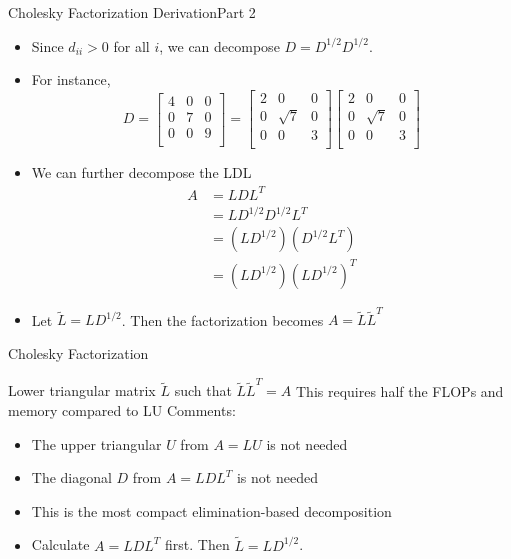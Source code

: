 \documentclass[10pt]{beamer}
\begin{document}
\begin{frame}{Cholesky Factorization Derivation}{Part 2}

\begin{itemize}
    \item Since $d_{ii}>0$ for all $i$, we can decompose $D = D^{1/2} D^{1/2}$. 
    
    \item For instance, 
    $$
    D = 
    \begin{bmatrix}
    4 & 0 &0\\
    0 & 7 &0\\
    0 & 0 &9\\
    \end{bmatrix} = 
    \begin{bmatrix}
    2 & 0 &0\\
    0 & \sqrt{7} &0\\
    0 & 0 &3\\
    \end{bmatrix}
    \begin{bmatrix}
    2 & 0 &0\\
    0 & \sqrt{7} &0\\
    0 & 0 &3\\
    \end{bmatrix}
    $$

    \item We can further decompose the LDL
        \begin{align*}
            A &= LDL^T\\ 
              &= L D^{1/2} D^{1/2} L^T \\ 
              &= (L D^{1/2}) (D^{1/2} L^T) \\ 
              &=  (L D^{1/2})(L D^{1/2})^T
        \end{align*}
    \item Let $\tilde{L} = L D^{1/2}$. Then the factorization becomes $A = \tilde{L}\tilde{L}^T$
    
\end{itemize}
\end{frame}
\begin{frame}{Cholesky Factorization}

{Lower triangular matrix $\tilde{L}$ such that $\tilde{L}\tilde{L}^T = A$}
{This requires half the FLOPs and memory compared to LU}
\vspace{3mm}
Comments:\\[2mm]
\begin{itemize}
    \item The upper triangular $U$ from $A=LU$ is not needed
    \item The diagonal $D$ from $A=LDL^T$ is not needed 
    \item This is the most compact elimination-based decomposition 
    \item Calculate $A=LDL^T$ first. Then $\tilde{L} = LD^{1/2}$.
\end{itemize}
\end{frame}
\end{document}
